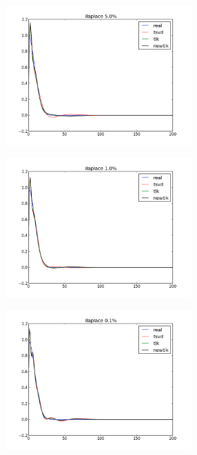 \documentclass{beamer}
\theoremstyle{plain}
\theoremstyle{definition}
\theoremstyle{remark}
\begin{document}
\begin{frame}
  \begin{figure}
    \centering
    \includegraphics[keepaspectratio,width=270px]{ilaplace_50.png}
  \end{figure}
\end{frame}

\begin{frame}
  \begin{figure}
    \centering
    \includegraphics[keepaspectratio,width=270px]{ilaplace_10.png}
  \end{figure}
\end{frame}

\begin{frame}
  \begin{figure}
    \centering
    \includegraphics[keepaspectratio,width=270px]{ilaplace_1.png}
  \end{figure}
\end{frame}
\end{document}
